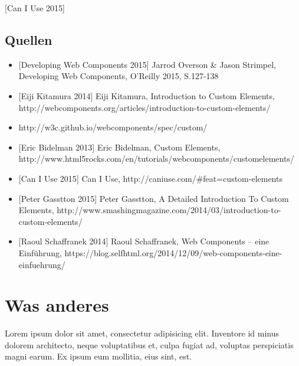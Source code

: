 \documentclass[11pt,a4paper]{report}
\providecommand{\tightlist}{%
  \setlength{\itemsep}{0pt}\setlength{\parskip}{0pt}}
\begin{document}
{[}Can I Use 2015{]}

\section{Quellen}\label{quellen}

\begin{itemize}
\tightlist
\item
  {[}Developing Web Components 2015{]} Jarrod Overson \& Jason Strimpel,
  Developing Web Components, O'Reilly 2015, S.127-138
\item
  {[}Eiji Kitamura 2014{]} Eiji Kitamura, Introduction to Custom
  Elements,
  http://webcomponents.org/articles/introduction-to-custom-elements/
\item
  http://w3c.github.io/webcomponents/spec/custom/
\item
  {[}Eric Bidelman 2013{]} Eric Bidelman, Custom Elements,
  http://www.html5rocks.com/en/tutorials/webcomponents/customelements/
\item
  {[}Can I Use 2015{]} Can I Use,
  http://caniuse.com/\#feat=custom-elements
\item
  {[}Peter Gasstton 2015{]} Peter Gasstton, A Detailed Introduction To
  Custom Elements,
  http://www.smashingmagazine.com/2014/03/introduction-to-custom-elements/
\item
  {[}Raoul Schaffranek 2014{]} Raoul Schaffranek, Web Components -- eine
  Einführung,
  https://blog.selfhtml.org/2014/12/09/web-components-eine-einfuehrung/
\end{itemize}

\chapter{Was anderes}\label{was-anderes}

Lorem ipsum dolor sit amet, consectetur adipisicing elit. Inventore id
minus dolorem architecto, neque voluptatibus et, culpa fugiat ad,
voluptas perspiciatis magni earum. Ex ipsum eum mollitia, eius sint,
est.
\end{document}
